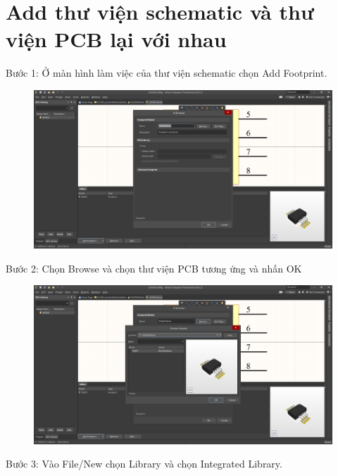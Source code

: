     \section{Add thư viện schematic và thư viện PCB lại với nhau}
        Bước 1: Ở màn hình làm việc của thư viện schematic chọn Add Footprint.
        \begin{figure}[H]
            \centering
            \includegraphics[width=1\textwidth]{pictures/ch3.12.png}
        \end{figure}
        Bước 2: Chọn Browse và chọn thư viện PCB tương ứng và nhấn OK
        \begin{figure}[H]
            \centering
            \includegraphics[width=1\textwidth]{pictures/ch3.13.png}
        \end{figure}
        \cleardoublepage
        Bước 3: Vào File/New chọn Library và chọn Integrated Library.
